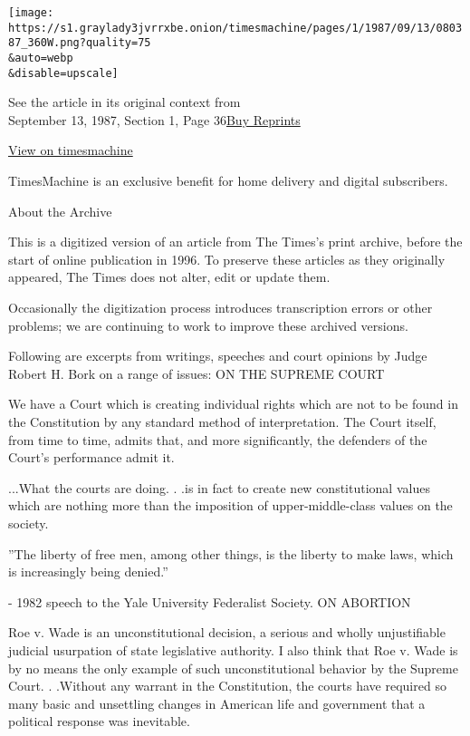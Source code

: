 \texttt{[image: https://s1.graylady3jvrrxbe.onion/timesmachine/pages/1/1987/09/13/080387\_360W.png?quality=75\\\&auto=webp\\\&disable=upscale]}

See the article in its original context from\\
September 13, 1987, Section 1, Page
36\href{https://store.nytimes3xbfgragh.onion/collections/new-york-times-page-reprints?utm_source=nytimes\&utm_medium=article-page\&utm_campaign=reprints}{Buy
Reprints}

\href{http://timesmachine.nytimes3xbfgragh.onion/timesmachine/1987/09/13/080387.html}{View
on timesmachine}

TimesMachine is an exclusive benefit for home delivery and digital
subscribers.

About the Archive

This is a digitized version of an article from The Times's print
archive, before the start of online publication in 1996. To preserve
these articles as they originally appeared, The Times does not alter,
edit or update them.

Occasionally the digitization process introduces transcription errors or
other problems; we are continuing to work to improve these archived
versions.

Following are excerpts from writings, speeches and court opinions by
Judge Robert H. Bork on a range of issues: ON THE SUPREME COURT

We have a Court which is creating individual rights which are not to be
found in the Constitution by any standard method of interpretation. The
Court itself, from time to time, admits that, and more significantly,
the defenders of the Court's performance admit it.

...What the courts are doing. . .is in fact to create new constitutional
values which are nothing more than the imposition of upper-middle-class
values on the society.

''The liberty of free men, among other things, is the liberty to make
laws, which is increasingly being denied.''

- 1982 speech to the Yale University Federalist Society. ON ABORTION

Roe v. Wade is an unconstitutional decision, a serious and wholly
unjustifiable judicial usurpation of state legislative authority. I also
think that Roe v. Wade is by no means the only example of such
unconstitutional behavior by the Supreme Court. . .Without any warrant
in the Constitution, the courts have required so many basic and
unsettling changes in American life and government that a political
response was inevitable.

